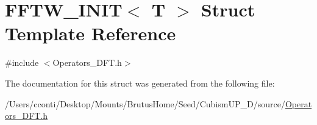 \hypertarget{struct_f_f_t_w___i_n_i_t}{}\section{F\+F\+T\+W\+\_\+\+I\+N\+I\+T$<$ T $>$ Struct Template Reference}
\label{struct_f_f_t_w___i_n_i_t}


{\ttfamily \#include $<$Operators\+\_\+\+D\+F\+T.\+h$>$}



The documentation for this struct was generated from the following file\+:\begin{DoxyCompactItemize}
\item 
/\+Users/cconti/\+Desktop/\+Mounts/\+Brutus\+Home/\+Seed/\+Cubism\+U\+P\+\_\+D/source/\hyperlink{_operators___d_f_t_8h}{Operators\+\_\+\+D\+F\+T.\+h}\end{DoxyCompactItemize}
